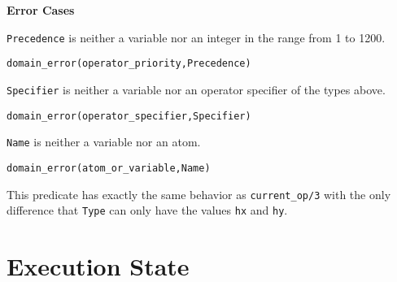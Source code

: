 \begin{description}
{\bf Error Cases}
\bi
\item 	{\tt Precedence} is neither a variable nor an integer in the
range from 1 to 1200. 
\bi
\item 	{\tt domain\_error(operator\_priority,Precedence)}
\ei
\item 	{\tt Specifier} is neither a variable nor an operator
specifier of the types above.
\bi
\item 	{\tt domain\_error(operator\_specifier,Specifier)}
\ei
\item 	{\tt Name} is neither a variable nor an atom.
\bi
\item 	{\tt domain\_error(atom\_or\_variable,Name)}
\ei
\ei

 This
predicate has exactly the same behavior as {\tt current\_op/3} with
the only difference that {\tt Type} can only have the values {\tt hx}
and {\tt hy}.


\end{description}








\section{Execution State}\label{environmental}

